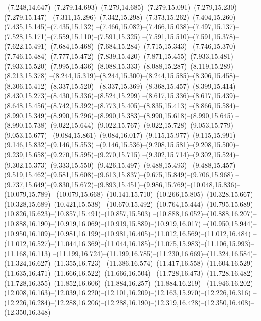   --(7.248,14.647)--(7.279,14.693)--(7.279,14.685)--(7.279,15.091)--(7.279,15.230)--(7.279,15.147)%
  --(7.311,15.296)--(7.342,15.298)--(7.373,15.262)--(7.404,15.260)--(7.435,15.145)--(7.435,15.132)%
  --(7.466,15.082)--(7.466,15.038)--(7.497,15.137)--(7.528,15.171)--(7.559,15.110)--(7.591,15.325)%
  --(7.591,15.510)--(7.591,15.378)--(7.622,15.491)--(7.684,15.468)--(7.684,15.284)--(7.715,15.343)%
  --(7.746,15.370)--(7.746,15.484)--(7.777,15.472)--(7.839,15.420)--(7.871,15.455)--(7.933,15.481)%
  --(7.933,15.520)--(7.995,15.436)--(8.088,15.333)--(8.088,15.287)--(8.119,15.289)--(8.213,15.378)%
  --(8.244,15.319)--(8.244,15.300)--(8.244,15.585)--(8.306,15.458)--(8.306,15.412)--(8.337,15.520)%
  --(8.337,15.369)--(8.368,15.457)--(8.399,15.414)--(8.430,15.273)--(8.430,15.336)--(8.524,15.299)%
  --(8.617,15.336)--(8.617,15.439)--(8.648,15.456)--(8.742,15.392)--(8.773,15.405)--(8.835,15.413)%
  --(8.866,15.584)--(8.990,15.349)--(8.990,15.296)--(8.990,15.383)--(8.990,15.618)--(8.990,15.645)%
  --(8.990,15.738)--(9.022,15.644)--(9.022,15.767)--(9.022,15.728)--(9.053,15.779)--(9.053,15.677)%
  --(9.084,15.861)--(9.084,16.017)--(9.115,15.977)--(9.115,15.991)--(9.146,15.832)--(9.146,15.553)%
  --(9.146,15.536)--(9.208,15.581)--(9.208,15.500)--(9.239,15.658)--(9.270,15.595)--(9.270,15.715)%
  --(9.302,15.714)--(9.302,15.524)--(9.302,15.373)--(9.333,15.550)--(9.426,15.497)--(9.488,15.493)%
  --(9.488,15.457)--(9.519,15.462)--(9.581,15.608)--(9.613,15.837)--(9.675,15.849)--(9.706,15.968)%
  --(9.737,15.649)--(9.830,15.672)--(9.893,15.451)--(9.986,15.769)--(10.048,15.836)--(10.079,15.789)%
  --(10.079,15.668)--(10.141,15.710)--(10.266,15.805)--(10.328,15.667)--(10.328,15.689)--(10.421,15.538)%
  --(10.670,15.492)--(10.764,15.444)--(10.795,15.689)--(10.826,15.623)--(10.857,15.491)--(10.857,15.503)%
  --(10.888,16.052)--(10.888,16.207)--(10.888,16.190)--(10.919,16.069)--(10.919,15.889)--(10.919,16.017)%
  --(10.950,15.944)--(10.950,16.109)--(10.981,16.199)--(10.981,16.405)--(11.012,16.569)--(11.012,16.484)%
  --(11.012,16.527)--(11.044,16.369)--(11.044,16.185)--(11.075,15.983)--(11.106,15.993)--(11.168,16.113)%
  --(11.199,16.724)--(11.199,16.785)--(11.230,16.669)--(11.324,16.584)--(11.324,16.627)--(11.355,16.723)%
  --(11.386,16.574)--(11.417,16.558)--(11.604,16.529)--(11.635,16.471)--(11.666,16.522)--(11.666,16.504)%
  --(11.728,16.473)--(11.728,16.482)--(11.728,16.355)--(11.852,16.606)--(11.884,16.257)--(11.884,16.219)%
  --(11.946,16.202)--(12.008,16.163)--(12.039,16.220)--(12.101,16.209)--(12.163,15.970)--(12.226,16.316)%
  --(12.226,16.284)--(12.288,16.206)--(12.288,16.190)--(12.319,16.428)--(12.350,16.408)--(12.350,16.348)%
